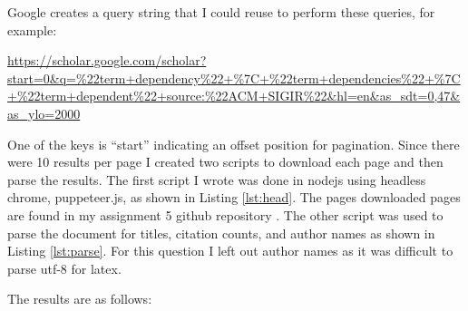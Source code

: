 \documentclass[letterpaper,11pt]{article}
\begin{document}
Google creates a query string that I could reuse to perform these queries, for example:

\url{https://scholar.google.com/scholar?start=0&q=\%22term+dependency\%22+\%7C+\%22term+dependencies\%22+\%7C+\%22term+dependent\%22+source:\%22ACM+SIGIR\%22&hl=en&as_sdt=0,47&as_ylo=2000}

One of the keys is ``start'' indicating an offset position for pagination.
Since there were 10 results per page I created two scripts to download each page and then parse the results.
The first script I wrote was done in nodejs using headless chrome, puppeteer.js, as shown in Listing \ref{lst:head}.
The pages downloaded pages are found in my assignment 5 github repository \cite{github}.
The other script was used to parse the document for titles, citation counts, and author names as shown in Listing \ref{lst:parse}.
For this question I left out author names as it was difficult to parse utf-8 for latex.

The results are as follows:
\end{document}

